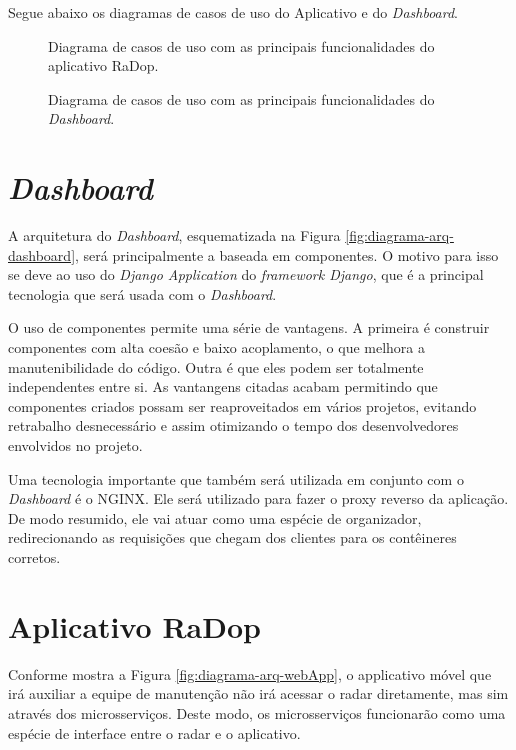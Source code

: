 Segue abaixo os diagramas de casos de uso do Aplicativo e do \textit{Dashboard}.

\begin{figure}[ht]
	\caption{\label{fig:casos_de_uso} Diagrama de casos de uso com as principais funcionalidades do aplicativo RaDop.}
\end{figure}\newpage

\begin{figure}[ht]
	\caption{\label{fig:diagrama-comm-soft} Diagrama de casos de uso com as principais funcionalidades do \textit{Dashboard}.}
\end{figure}

\section{\textit{Dashboard}}

A arquitetura do \textit{Dashboard}, esquematizada na Figura \ref{fig:diagrama-arq-dashboard}, será principalmente a baseada em componentes. O motivo para isso se deve ao uso do \textit{Django Application} do \textit{framework Django}, que é a principal tecnologia que será usada com o \textit{Dashboard}.

O uso de componentes permite uma série de vantagens. A primeira é construir componentes com alta coesão e baixo acoplamento, o que melhora a manutenibilidade do código. Outra é que eles podem ser totalmente independentes entre si. As vantangens citadas acabam permitindo que componentes criados possam ser reaproveitados em vários projetos, evitando retrabalho desnecessário e assim otimizando o tempo dos desenvolvedores envolvidos no projeto.

Uma tecnologia importante que também será utilizada em conjunto com o \textit{Dashboard} é o NGINX. Ele será utilizado para fazer o proxy reverso da aplicação. De modo resumido, ele vai atuar como uma espécie de organizador, redirecionando as requisições que chegam dos clientes para os contêineres corretos.

\section{Aplicativo RaDop}

Conforme mostra a Figura \ref{fig:diagrama-arq-webApp}, o applicativo móvel que irá auxiliar a equipe de manutenção não irá acessar o radar diretamente, mas sim através dos microsserviços. Deste modo, os microsserviços funcionarão como uma espécie de interface entre o radar e o aplicativo.

